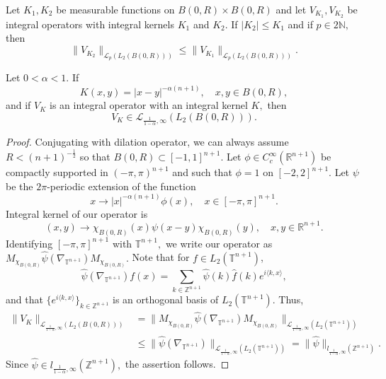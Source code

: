 \documentclass[12pt]{amsart}
\begin{document}
\begin{lemma}\cite[Theorem 2.13]{MR2154153}\label{positive schur lemma} Let $K_1,K_2$ be measurable functions on $B(0,R)\times B(0,R)$ and let $V_{K_1},V_{K_2}$ be integral operators with integral kernels $K_1$ and $K_2.$ If $|K_2|\leq K_1$ and if $p\in2\mathbb{N},$ then
$$\|V_{K_2}\|_{\mathcal{L}_p(L_2(B(0,R)))}\leq\|V_{K_1}\|_{\mathcal{L}_p(L_2(B(0,R)))}.$$
\end{lemma}

\begin{lemma}\label{convolution operator lemma} Let $0<\alpha<1.$ If
$$K(x,y)=|x-y|^{-\alpha(n+1)},\quad x,y\in B(0,R),$$
and if $V_K$ is an integral operator with an integral kernel $K,$ then $$V_K\in\mathcal{L}_{\frac{1}{1-\alpha},\infty}(L_2(B(0,R))).$$
\end{lemma}
\begin{proof} Conjugating with dilation operator, we can always assume $R<(n+1)^{-\frac12}$ so that $B(0,R)\subset [-1,1]^{n+1}.$ Let $\phi\in C^{\infty}_c(\mathbb{R}^{n+1})$ be compactly supported in $(-\pi,\pi)^{n+1}$ and such that $\phi=1$ on $[-2,2]^{n+1}.$ Let $\psi$ be the $2\pi$-periodic extension of the function
$$x\to |x|^{-\alpha(n+1)}\phi(x),\quad x\in[-\pi,\pi]^{n+1}.$$
Integral kernel of our operator is
$$(x,y)\to \chi_{B(0,R)}(x)\psi(x-y)\chi_{B(0,R)}(y),\quad x,y\in\mathbb{R}^{n+1}.$$
Identifying $[-\pi,\pi]^{n+1}$ with $\mathbb{T}^{n+1},$ we write our operator as $M_{\chi_{B(0,R)}}\hat{\psi}(\nabla_{\mathbb{T}^{n+1}})M_{\chi_{B(0,R)}}.$ Note that for $f\in L_2(\mathbb{T}^{n+1})$,
$$\hat{\psi}(\nabla_{\mathbb{T}^{n+1}})f(x)=\sum_{k\in\mathbb{Z}^{n+1}}\hat{\psi}(k)\hat{f}(k) e^{i\langle k,x\rangle},$$
and that $\{e^{i\langle k,x\rangle}\}_{k\in\mathbb{Z}^{n+1}}$ is an orthogonal basis of $L_2(\mathbb{T}^{n+1})$.
Thus,
\begin{align*}
\|V_K\|_{\mathcal{L}_{\frac{1}{1-\alpha},\infty}(L_2(B(0,R)))}&=\|M_{\chi_{B(0,R)}}\hat{\psi}(\nabla_{\mathbb{T}^{n+1}})M_{\chi_{B(0,R)}}\|_{\mathcal{L}_{\frac{1}{1-\alpha},\infty}(L_2(\mathbb{T}^{n+1}))}\\
&\leq\|\hat{\psi}(\nabla_{\mathbb{T}^{n+1}})\|_{\mathcal{L}_{\frac{1}{1-\alpha},\infty}(L_2(\mathbb{T}^{n+1}))}=\|\hat{\psi}\|_{l_{\frac1{1-\alpha},\infty}(\mathbb{Z}^{n+1})}.
\end{align*}
Since $\hat{\psi}\in l_{\frac1{1-\alpha},\infty}(\mathbb{Z}^{n+1}),$ the assertion follows.
\end{proof}
\end{document}
